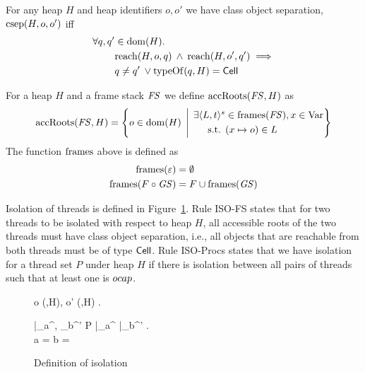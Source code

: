 \begin{definition}
  For any heap $H$ and heap identifiers $o, o'$ we have class object separation,
  $\mbox{$\mathrm{csep}$}{(H, o, o')}$ iff
  \begin{align}
    \label{eq:csep_def}
    \forall q, q' &\in \mbox{$\mathrm{dom}$}{(H)}. \notag\\
    & \mbox{$\mathrm{reach}$}{(H, o, q)} \: \land \: \mbox{$\mathrm{reach}$}{(H, o', q')} \implies \notag\\ 
    &q \neq q' \: \lor \mbox{$\mathrm{typeOf}$}{(q, H)} = \mbox{$\mathsf{Cell}$}
  \end{align}
\end{definition}

\begin{definition}
  For a heap $H$ and a frame stack $\mathit{FS}$ we define $\mbox{$\mathrm{accRoots}$}{(\ensuremath{\mathit{FS}}, H)}$ as
  \begin{equation*}
    \mbox{$\mathrm{accRoots}$}{(\ensuremath{\mathit{FS}}, H)} = \left\{ o \in \mbox{$\mathrm{dom}$}{(H)} \:\: \middle| \:\:
    \begin{aligned}
      \exists \mbox{$\langle L, t \rangle^s$} &\in \mbox{$\mathrm{frames}$}(\mathit{FS}), x \in \mathrm{Var}  \\
         \text{s.t. } & (x \mapsto o) \in L
    \end{aligned}
    \right\}
  \end{equation*}
  The function $\mbox{$\mathrm{frames}$}$ above is defined as 
  \begin{equation*}
    \begin{aligned}
      \mbox{$\mathrm{frames}$}(\varepsilon) &= \emptyset \\
      \mbox{$\mathrm{frames}$}(F \circ \mathit{GS}) &= F \cup \mbox{$\mathrm{frames}$}(\mathit{GS})
    \end{aligned}
  \end{equation*}
\end{definition}

Isolation of threads is defined in Figure~\ref{fig:def_isolation}. Rule {\sc
ISO-FS} states that for two threads to be isolated with respect to heap $H$, all
accessible roots of the two threads must have class object separation, i.e., 
all objects that are reachable from both threads must be of type $\mbox{$\mathsf{Cell}$}$.
Rule {\sc ISO-Procs} states that we have isolation for a thread set $P$ under
heap $H$ if there is isolation between all pairs of threads such that at least
one is $\mbox{$ocap$}$.

\begin{figure}
  { 
    \forall o \in \accRoots(\FS,H), o' \in \accRoots(\GS,H) . \: 
  }
  {
  }
  
  \RuleSpace{}

  {
    \forall \FS|_a^\iota, \GS_b^{\iota'} \in P  \FS|_a^\iota \neq
    \GS|_b^{\iota'} . \\
    a = \ocap \: \lor \: b = \ocap \implies {}
  }
  {
  }
  \caption{Definition of isolation}
  \label{fig:def_isolation}
\end{figure}

